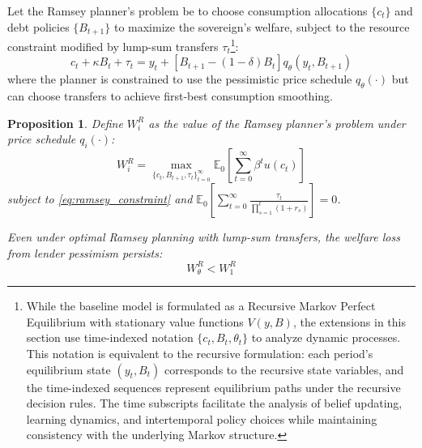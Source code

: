 \documentclass[12pt]{article}
\theoremstyle{plain}
\newtheorem{proposition}{Proposition}
\begin{document}
Let the Ramsey planner's problem be to choose consumption allocations $\{c_t\}$
and debt policies $\{B_{t+1}\}$ to maximize the sovereign's welfare, subject to
the resource constraint modified by lump-sum transfers $\tau_t$\footnote{While
	the baseline model is formulated as a Recursive Markov Perfect Equilibrium with
	stationary value functions $V(y,B)$, the extensions in this section use
	time-indexed notation $\{c_t, B_t, \theta_t\}$ to analyze dynamic processes.
	This notation is equivalent to the recursive formulation: each period's
	equilibrium state $(y_t, B_t)$ corresponds to the recursive state variables,
	and the time-indexed sequences represent equilibrium paths under the recursive
	decision rules. The time subscripts facilitate the analysis of belief updating,
	learning dynamics, and intertemporal policy choices while maintaining
	consistency with the underlying Markov structure.}:
\begin{equation}
	c_t + \kappa B_t + \tau_t = y_t + [B_{t+1} - (1-\delta)B_t]q_\theta(y_t, B_{t+1}) \label{eq:ramsey_constraint}
\end{equation}
where the planner is constrained to use the pessimistic price schedule $q_\theta(\cdot)$ but can choose transfers to achieve first-best consumption smoothing.

\begin{proposition}\label{prop:ramsey_welfare}
	Define $W^R_i$ as the value of the Ramsey planner's problem under price schedule $q_i(\cdot)$:
	\begin{equation}
		W^R_i = \max_{\{c_t, B_{t+1}, \tau_t\}_{t=0}^\infty} \mathbb{E}_0 \left[ \sum_{t=0}^\infty \beta^t u(c_t) \right] \label{eq:ramsey_welfare_def}
	\end{equation}
	subject to \eqref{eq:ramsey_constraint} and $\mathbb{E}_0 \left[ \sum_{t=0}^\infty \frac{\tau_t}{\prod_{s=1}^t (1+r_s)} \right] = 0$.

	Even under optimal Ramsey planning with lump-sum transfers, the welfare loss
	from lender pessimism persists:
	\begin{equation}
		W^R_\theta < W^R_1 \label{eq:ramsey_welfare_loss}
	\end{equation}
\end{proposition}
\end{document}
